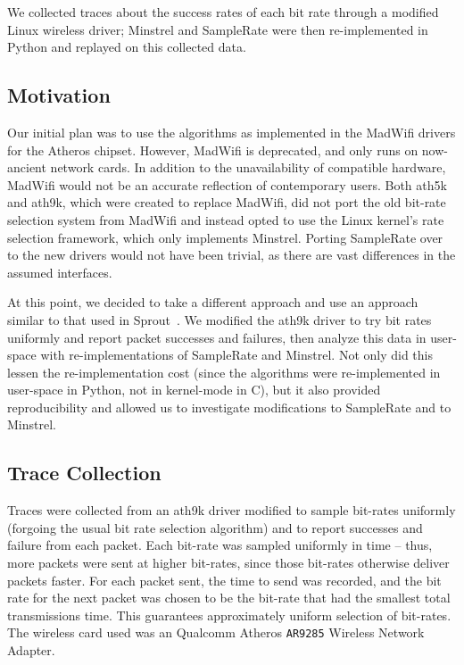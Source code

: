 \documentclass[letterpaper,twocolumn,10pt]{article}
\begin{document}
We collected traces about the success rates of each bit rate through a
modified Linux wireless driver; Minstrel and SampleRate were then
re-implemented in Python and replayed on this collected data.

\subsection{Motivation}

Our initial plan was to use the algorithms as implemented in the
MadWifi drivers for the Atheros chipset. However, MadWifi is
deprecated, and only runs on now-ancient network cards. In addition to
the unavailability of compatible hardware, MadWifi would not be an
accurate reflection of contemporary users. Both ath5k and ath9k, which
were created to replace MadWifi, did not port the old bit-rate
selection system from MadWifi and instead opted to use the Linux
kernel's rate selection framework, which only implements Minstrel.
Porting SampleRate over to the new drivers would not have been
trivial, as there are vast differences in the assumed interfaces.

At this point, we decided to take a different approach and use an
approach similar to that used in Sprout~\cite{sprout}.  We modified
the ath9k driver to try bit rates uniformly and report packet
successes and failures, then analyze this data in user-space with
re-implementations of SampleRate and Minstrel.  Not only did this
lessen the re-implementation cost (since the algorithms were
re-implemented in user-space in Python, not in kernel-mode in C), but
it also provided reproducibility and allowed us to investigate
modifications to SampleRate and to Minstrel.

\subsection{Trace Collection}

Traces were collected from an ath9k driver modified to sample
bit-rates uniformly (forgoing the usual bit rate selection algorithm)
and to report successes and failure from each packet.  Each bit-rate
was sampled uniformly in time -- thus, more packets were sent at
higher bit-rates, since those bit-rates otherwise deliver packets
faster.  For each packet sent, the time to send was recorded, and the
bit rate for the next packet was chosen to be the bit-rate that had
the smallest total transmissions time.  This guarantees approximately
uniform selection of bit-rates.  The wireless card used was an
Qualcomm Atheros \texttt{AR9285} Wireless Network Adapter.
\end{document}
